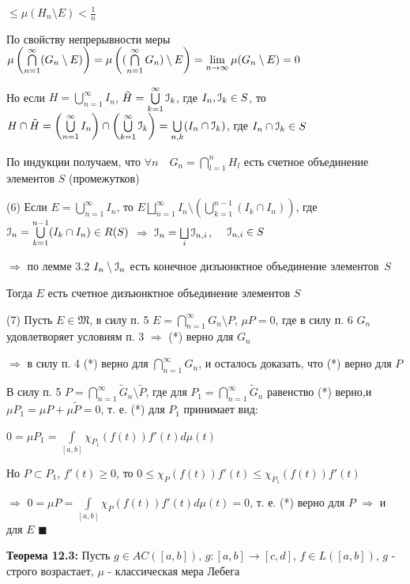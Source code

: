\documentclass[a4paper]{report}
\newcommand*{\hm}[1]{#1\nobreak\discretionary{}%
            {\hbox{$\mathsurround=0pt #1$}}{}}
\begin{document}
\noindent$\le\mu(H_n\setminus E)<\frac1n$

По свойству непрерывности меры $\mu\left(\bigcap\limits_{n=1}^\infty(G_n\setminus E)\right)=\mu\left((\bigcap\limits_{n=1}^\infty G_n)\setminus E\right)\hm=\lim\limits_{n\to\infty}\mu(G_n\setminus E)=0$

Но если $H=\bigcup\limits_{n=1}^\infty I_n$, $\tilde H=\bigcup\limits_{k=1}^\infty \EuScript I_k$, где $I_n,\EuScript I_k\in S$, то $H\cap\tilde H=\left(\bigcup\limits_{n=1}^\infty I_n\right)\hm\cap\left(\bigcup\limits_{k=1}^\infty\EuScript I_k\right)=\bigcup\limits_{n,k}(I_n\cap\EuScript I_k)$, где $I_n\cap\EuScript I_k\in S$

По индукции получаем, что $\forall n\quad G_n=\bigcap\limits_{l=1}^n H_l$ есть счетное объединение элементов $S$ (промежутков)

(6) Если $E=\bigcup\limits_{n=1}^\infty I_n$, то $E\bigsqcup\limits_{n=1}^\infty I_n\setminus\left(\bigcup\limits_{k=1}^{n-1}(I_k\cap I_n)\right)$, где $\EuScript I_n=\bigcup\limits_{k=1}^{n-1}(I_k\cap I_n)\hm\in R(S)$ $\Rightarrow$ $\EuScript I_n=\bigsqcup\limits_i\EuScript I_{n,i}$, $\quad\EuScript I_{n,i}\in S$

\noindent $\Rightarrow$ по лемме 3.2 $I_n\setminus\EuScript I_n$ есть конечное дизъюнктное объединение \mbox{элементов $S$}

Тогда $E$ есть счетное дизъюнктное объединение элементов $S$
\smallskip

(7) Пусть $E\in\mathfrak M$, в силу п. 5 $E=\bigcap\limits_{n=1}^\infty G_n\setminus P$, $\mu P=0$, где в силу п. 6 $G_n$ удовлетворяет условиям п. 3 $\Rightarrow$
(*) верно для $G_n$

$\Rightarrow$ в силу п. 4 (*) верно для $\bigcap\limits_{n=1}^\infty G_n$, и осталось доказать, что (*) верно для $P$

В силу п. 5 $P=\bigcap\limits_{n=1}^\infty\tilde G_n\setminus\tilde P$, где для $P_1=\bigcap\limits_{n=1}^\infty\tilde G_n$ равенство (*) верно,и $\mu P_1=\mu P+\mu
\tilde P=0$, т. е. (*) для $P_1$ принимает вид:

$0=\mu P_1=\displaystyle\int\limits_{[a,b]}\chi_{P_1}(f(t))f'(t)d\mu(t)$

Но $P\subset P_1$, $f'(t)\ge0$, то $0\le\chi_P(f(t))f'(t)\le\chi_{P_1}(f(t))f'(t)$

\noindent $\Rightarrow$ $0=\mu P=\displaystyle\int\limits_{[a,b]}\chi_P(f(t))f'(t)d\mu(t)=0$, т. е. (*) верно для $P$ $\Rightarrow$ и для $E$ $\blacksquare$
\bigskip

\noindent\textbf{Теорема 12.3:} Пусть $g\in AC([a,b])$, $g\colon[a,b]\to[c,d]$, $f\in L([a,b])$, $g$ - строго возрастает, $\mu$ - классическая мера Лебега
\end{document}

